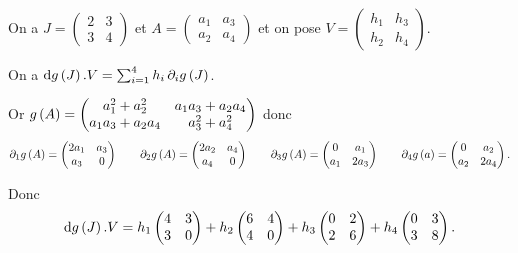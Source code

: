 \begin{corr}~\\
On a \(J=\begin{pmatrix}
2 & 3 \\
3 & 4
\end{pmatrix}\) et \(A=\begin{pmatrix}
a_1 & a_3 \\
a_2 & a_4
\end{pmatrix}\) et on pose \(V=\begin{pmatrix}
h_1 & h_3 \\
h_2 & h_4
\end{pmatrix}\).

On a \(\odif{g}\paren{J}.V=\sum_{i=1}^4h_i\pdif{i}g\paren{J}\).

Or \(g\left(A\right)=\begin{pmatrix}
a_1^2+a_2^2 & a_1a_3+a_2a_4 \\
a_1a_3+a_2a_4 & a_3^2+a_4^2
\end{pmatrix}\) donc \[\pdif{1}g\paren{A}=\begin{pmatrix}
2a_1 & a_3 \\
a_3 & 0
\end{pmatrix}\qquad\pdif{2}g\paren{A}=\begin{pmatrix}
2a_2 & a_4 \\
a_4 & 0
\end{pmatrix}\qquad\pdif{3}g\paren{A}=\begin{pmatrix}
0 & a_1 \\
a_1 & 2a_3
\end{pmatrix}\qquad\pdif{4}g\paren{a}=\begin{pmatrix}
0 & a_2 \\
a_2 & 2a_4
\end{pmatrix}.\]

Donc \[\odif{g}\paren{J}.V=h_1\begin{pmatrix}
4 & 3 \\
3 & 0
\end{pmatrix}+h_2\begin{pmatrix}
6 & 4 \\
4 & 0
\end{pmatrix}+h_3\begin{pmatrix}
0 & 2 \\
2 & 6
\end{pmatrix}+h_4\begin{pmatrix}
0 & 3 \\
3 & 8
\end{pmatrix}.\]
\end{corr}

